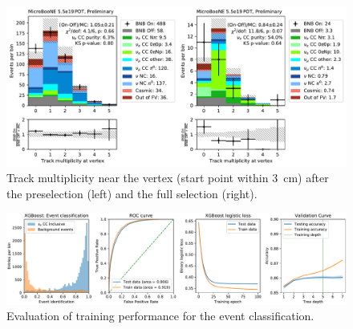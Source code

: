 \begin{figure}[b]
\centering
\includegraphics[height=0.27\textheight]{NueCCsel/Images/datamc/event_trk_at_vtx.pdf}
\caption[Vertex track multiplicity]{Track multiplicity near the vertex (start point within \SI{3}{\cm}) after the preselection (left) and the full \nuecc selection (right).}
\label{fig:nuecc:trk_at_vtx}
\end{figure}

\begin{figure}[htb]
\centering
\includegraphics[width=\textwidth]{NueCCsel/Images/training/event_bdt_test.pdf}
\caption[Evaluation of training performance for the \nuecc event classification]{Evaluation of training performance for the \nuecc event classification.}
\label{fig:nuecc:train_event}
\end{figure}

